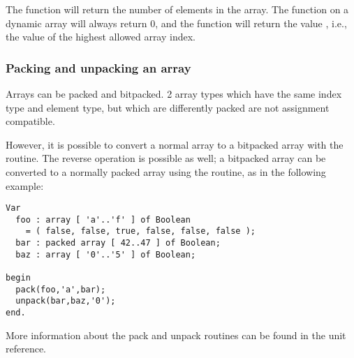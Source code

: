 The  function will return the number of elements in the array.
The  function on a dynamic array will always return 0, and the
 function will return the value , i.e., the value of the
highest allowed array index. 


\subsubsection{Packing and unpacking an array}
Arrays can be packed and bitpacked. 2 array types which have the same index
type and element type, but which are differently packed are not assignment 
compatible.

However, it is possible to convert a normal array to a bitpacked array with the
 routine. The reverse operation is possible as well; a bitpacked
array can be converted to a normally packed array using the 
routine, as in the following example:
\begin{verbatim}
Var
  foo : array [ 'a'..'f' ] of Boolean 
    = ( false, false, true, false, false, false );
  bar : packed array [ 42..47 ] of Boolean;
  baz : array [ '0'..'5' ] of Boolean;

begin
  pack(foo,'a',bar);
  unpack(bar,baz,'0');
end.
\end{verbatim}
More information about the pack and unpack routines can be found in the
 unit reference.

%
